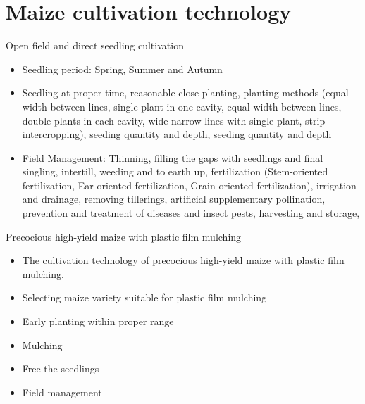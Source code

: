 \documentclass[11pt,dvipsnames,ignorenonframetext,aspectratio=169]{beamer}
\providecommand{\tightlist}{%
  \setlength{\itemsep}{0pt}\setlength{\parskip}{0pt}}
\begin{document}
\hypertarget{maize-cultivation-technology}{%
\section{Maize cultivation
technology}\label{maize-cultivation-technology}}

\begin{frame}{Open field and direct seedling cultivation}
\protect\hypertarget{open-field-and-direct-seedling-cultivation}{}

\begin{itemize}
\tightlist
\item
  Seedling period: Spring, Summer and Autumn
\item
  Seedling at proper time, reasonable close planting, planting methods
  (equal width between lines, single plant in one cavity, equal width
  between lines, double plants in each cavity, wide-narrow lines with
  single plant, strip intercropping), seeding quantity and depth,
  seeding quantity and depth
\item
  Field Management: Thinning, filling the gaps with seedlings and final
  singling, intertill, weeding and to earth up, fertilization
  (Stem-oriented fertilization, Ear-oriented fertilization,
  Grain-oriented fertilization), irrigation and drainage, removing
  tillerings, artificial supplementary pollination, prevention and
  treatment of diseases and insect pests, harvesting and storage,
\end{itemize}

\end{frame}

\begin{frame}{Precocious high-yield maize with plastic film mulching}
\protect\hypertarget{precocious-high-yield-maize-with-plastic-film-mulching}{}

\begin{itemize}
\tightlist
\item
  The cultivation technology of precocious high-yield maize with plastic
  film mulching.
\item
  Selecting maize variety suitable for plastic film mulching
\item
  Early planting within proper range
\item
  Mulching
\item
  Free the seedlings
\item
  Field management
\end{itemize}

\end{frame}
\end{document}

